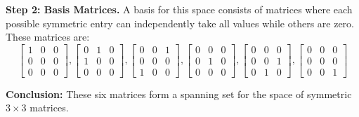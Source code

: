 \documentclass[12pt]{article}
\begin{document}
\textbf{Step 2: Basis Matrices.} A basis for this space consists of matrices where each possible symmetric entry can independently take all values while others are zero. These matrices are:
\[
\begin{bmatrix} 1 & 0 & 0 \\ 0 & 0 & 0 \\ 0 & 0 & 0 \end{bmatrix}, \begin{bmatrix} 0 & 1 & 0 \\ 1 & 0 & 0 \\ 0 & 0 & 0 \end{bmatrix}, \begin{bmatrix} 0 & 0 & 1 \\ 0 & 0 & 0 \\ 1 & 0 & 0 \end{bmatrix}, \begin{bmatrix} 0 & 0 & 0 \\ 0 & 1 & 0 \\ 0 & 0 & 0 \end{bmatrix}, \begin{bmatrix} 0 & 0 & 0 \\ 0 & 0 & 1 \\ 0 & 1 & 0 \end{bmatrix}, \begin{bmatrix} 0 & 0 & 0 \\ 0 & 0 & 0 \\ 0 & 0 & 1 \end{bmatrix}
\]

\textbf{Conclusion:} These six matrices form a spanning set for the space of symmetric \(3 \times 3\) matrices.


\newpage
\end{document}
